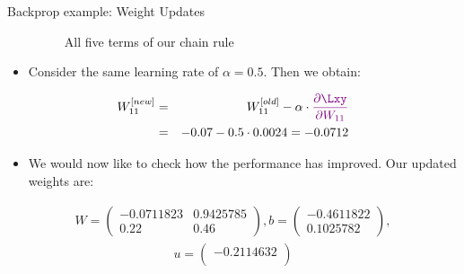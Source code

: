 \begin{vbframe}{Backprop example: Weight Updates}
\begin{itemize}
  \begin{figure}
    \centering
      \caption{All five terms of our chain rule}
  \end{figure}
\framebreak
    \item Consider the same learning rate of $\alpha = 0.5$. Then we obtain:
  \end{itemize}
    \begin{eqnarray*}
      W_{11}^{[new]}  &=& W_{11}^{[old]} - \alpha \cdot  \textcolor{violet}{\frac{\partial \Lxy}{\partial W_{11}}} \\
                  &=& -0.07 - 0.5 \cdot \num[round-mode=places,round-precision=4]{0.0023645} = \num[round-mode=places,round-precision=4]{-0.0711823}
    \end{eqnarray*}
  \begin{itemize}
    \item We would now like to check how the performance has improved. Our updated weights are:
  \end{itemize}
  \begin{eqnarray*}
    W = \begin{pmatrix}
    \num[round-mode=places,round-precision=4]{-0.0711823} & \num[round-mode=places,round-precision=4]{0.9425785} \\
    0.22 & 0.46
    \end{pmatrix},
    b = \begin{pmatrix}
    \num[round-mode=places,round-precision=4]{-0.4611822} \\
    \num[round-mode=places,round-precision=4]{0.1025782}
    \end{pmatrix},
  \end{eqnarray*}
  \begin{eqnarray*}
    u = \begin{pmatrix}
    \num[round-mode=places,round-precision=4]{-0.2114632} \\

\end{pmatrix}
\end{eqnarray*}
\end{vbframe}
